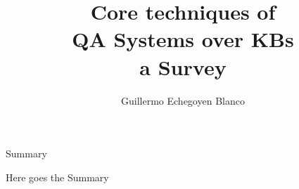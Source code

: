 \documentclass{beamer}
\title{Core techniques of \\ \textbf{QA Systems over KBs \\ a Survey}}
\author{Guillermo Echegoyen Blanco}
\date{}
\begin{document}
\maketitle


\begin{frame}{Summary}
  \begin{card}
    Here goes the Summary
  \end{card}
\end{frame}

\begin{comment}
\begin{frame}{Tasks}
  \centering
  \begin{columns}
    \setbeamercolor{coloredboxstuff}{fg=white,bg=white!10!box1}
    \begin{beamercolorbox}[wd=0.33\textwidth,sep=1em]{coloredboxstuff}
      \centering
      Question Analysis
    \end{beamercolorbox}
    \setbeamercolor{coloredboxstuff}{fg=white,bg=white!10!box2}
    \begin{beamercolorbox}[wd=0.33\textwidth,sep=1em]{coloredboxstuff}
      \centering
      Phrase Mapping
    \end{beamercolorbox}
    \setbeamercolor{coloredboxstuff}{fg=white,bg=white!10!box3}
    \begin{beamercolorbox}[wd=0.33\textwidth,sep=1em]{coloredboxstuff}
      \centering
      Disambiguation
    \end{beamercolorbox}
  \end{columns}
  \begin{columns}
    \setbeamercolor{coloredboxstuff}{fg=white,bg=white!10!box4}
    \begin{beamercolorbox}[wd=0.5\textwidth,sep=1em]{coloredboxstuff}
      \centering
      Query Construction
    \end{beamercolorbox}
    \setbeamercolor{coloredboxstuff}{fg=white,bg=white!10!box5}
    \begin{beamercolorbox}[wd=0.5\textwidth,sep=1em]{coloredboxstuff}
      \centering
      Distributed Knowledge
    \end{beamercolorbox}
  \end{columns}
\end{frame}
\end{comment}
\end{document}

